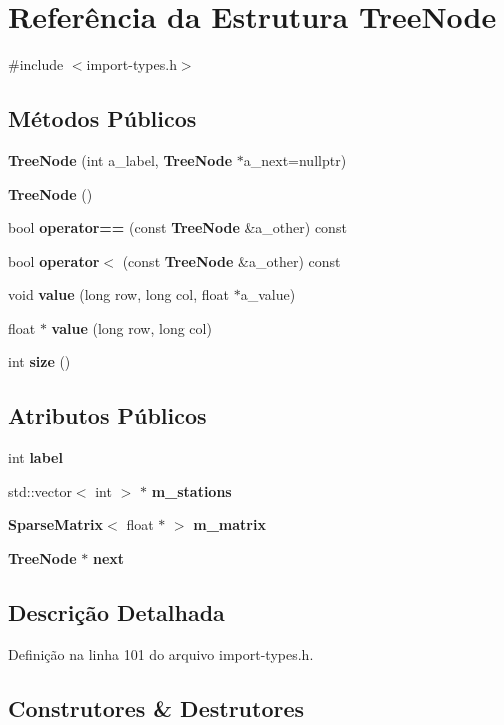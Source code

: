 \section{Referência da Estrutura Tree\+Node}
\label{struct_tree_node}


{\ttfamily \#include $<$import-\/types.\+h$>$}

\subsection*{Métodos Públicos}
\begin{DoxyCompactItemize}
\item 
{\bf Tree\+Node} (int a\+\_\+label, {\bf Tree\+Node} $\ast$a\+\_\+next=nullptr)
\item 
{\bf Tree\+Node} ()
\item 
bool {\bf operator==} (const {\bf Tree\+Node} \&a\+\_\+other) const 
\item 
bool {\bf operator$<$} (const {\bf Tree\+Node} \&a\+\_\+other) const 
\item 
void {\bf value} (long row, long col, float $\ast$a\+\_\+value)
\item 
float $\ast$ {\bf value} (long row, long col)
\item 
int {\bf size} ()
\end{DoxyCompactItemize}
\subsection*{Atributos Públicos}
\begin{DoxyCompactItemize}
\item 
int {\bf label}
\item 
std\+::vector$<$ int $>$ $\ast$ {\bf m\+\_\+stations}
\item 
{\bf Sparse\+Matrix}$<$ float $\ast$ $>$ {\bf m\+\_\+matrix}
\item 
{\bf Tree\+Node} $\ast$ {\bf next}
\end{DoxyCompactItemize}


\subsection{Descrição Detalhada}


Definição na linha 101 do arquivo import-\/types.\+h.



\subsection{Construtores \& Destrutores}
